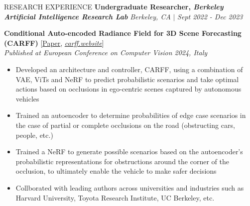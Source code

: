 \documentclass{resume} %
\begin{document}
\begin{rSection}{RESEARCH EXPERIENCE}
\textbf{Undergraduate Researcher, \textit{Berkeley Artificial Intelligence Research Lab}} \hfill {\it Berkeley, CA} \(|\) {\it Sept 2022 - Dec 2023}
\item {
    \textbf{Conditional Auto-encoded Radiance Field for 3D Scene Forecasting (CARFF)} [\href{https://link.springer.com/chapter/10.1007/978-3-031-73024-5_14}{Paper}, \textit{\href{carff.website}{carff.website}}] \\
    \textit{Published at European Conference on Computer Vision 2024, Italy}
    \begin{itemize}
        \itemsep -0.5em \vspace{-0.5em}
        \item Developed an architecture and controller, CARFF, using a combination of VAE, ViTs and NeRF to predict probabilistic scenarios and take optimal actions based on occlusions in ego-centric scenes captured by autonomous vehicles
        \item Trained an autoencoder to determine probabilities of edge case scenarios in the case of partial or complete occlusions on the road (obstructing cars, people, etc.)
        \item Trained a NeRF to generate possible scenarios based on the autoencoder's probabilistic representations for obstructions around the corner of the occlusion, to ultimately enable the vehicle to make safer decisions 
        \item Collborated with leading authors across universities and industries such as Harvard University, Toyota Research Institute, UC Berkeley, etc. 
    \end{itemize}
}


\end{rSection}
\end{document}
